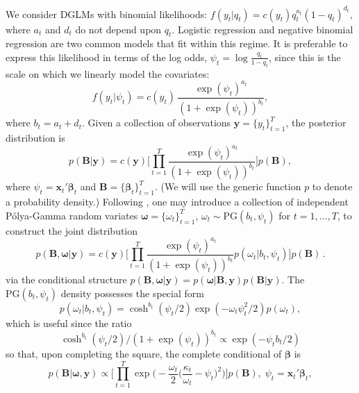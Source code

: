 \documentclass[12pt]{article}
\newcommand{\Polya}{P\'{o}lya}
\newcommand{\PG}{\text{PG}}
\newcommand{\bbeta}{\boldsymbol{\beta}}
\newcommand{\oomega}{\boldsymbol{\omega}}
\newcommand{\yy}{\boldsymbol{y}}
\newcommand{\vx}{\boldsymbol{x}}
\newcommand{\betap}{{\boldsymbol{B}}}
\begin{document}
We consider DGLMs with binomial likelihoods: \( f(y_t | q_t) = c(y_t) q_t^{a_t}
(1-q_t)^{d_t}, \) where $a_t$ and $d_t$ do not depend upon $q_t$.  Logistic
regression and negative binomial regression are two common models that fit
within this regime.  It is preferable to express this likelihood in terms of the
log odds, $\psi_t = \log \frac{q_t}{1-q_t}$, since this is the scale on which we
linearly model the covariates:
\[
f(y_t | \psi_t) = c(y_t) \, \frac{\exp(\psi_t)^{a_t}}{(1+\exp(\psi_t))^{b_t}},
\]
where $b_t = a_t + d_t$.  Given a collection of observations $\yy =
\{y_t\}_{t=1}^T$, the posterior distribution is
\[
p(\betap | \yy) = c(\yy) \Big[ \prod_{t=1}^T
\frac{\exp({\psi_t})^{a_t}}{(1+\exp({\psi_t}))^{b_t}}
\Big] p(\betap),
\]
where $\psi_t = \vx_t' \bbeta_t$ and $\betap = \{\bbeta_t\}_{t=1}^T$.  (We will use
the generic function $p$ to denote a probability density.)  Following
\cite{polson-etal-2013}, one may introduce a collection of independent
\Polya-Gamma random variates $\oomega = \{\omega_t\}_{t=1}^T$, $\omega_t \sim
\PG(b_t, \psi_t)$ for $t=1, \ldots, T$, to construct the joint distribution
\[
p(\betap, \oomega | \yy) = c(\yy) \Big[ \prod_{t=1}^T
\frac{\exp({\psi_t})^{a_t}}{(1+\exp({\psi_t}))^{b_t}} p(\omega_t | b_t, \psi_t)
\Big] p(\betap) \, .
\]
via the conditional structure $p(\betap, \oomega | \yy) = p(\oomega | \betap,
\yy) p(\betap | \yy)$.  The $\PG{}(b_t, \psi_t)$ density possesses the special
form
\[
p(\omega_t | b_t, \psi_t) = \cosh^{b_t}(\psi_t/2) \exp({- \omega_t \psi_t^2 / 2})
p(\omega_t),
\]
which is useful since the ratio
\begin{equation}
  \label{eqn:pg-cancellation}
  \cosh^{b_t}(\psi_t/2) / (1+\exp({\psi_t}))^{b_t}
  \propto
  \exp({-\psi_t b_t/2}) 
\end{equation}
so that, upon completing the square, the complete conditional of $\bbeta$ is
\[
p(\betap | \oomega, \yy) \propto \Big[ \prod_{t=1}^T \exp \Big(-\frac{\omega_t}{2}
\Big(\frac{\kappa_t}{\omega_t} - \psi_t\Big)^2 \Big) \Big] p(\betap), \; \psi_t
= \vx_t' \bbeta_t,
\]
\end{document}
